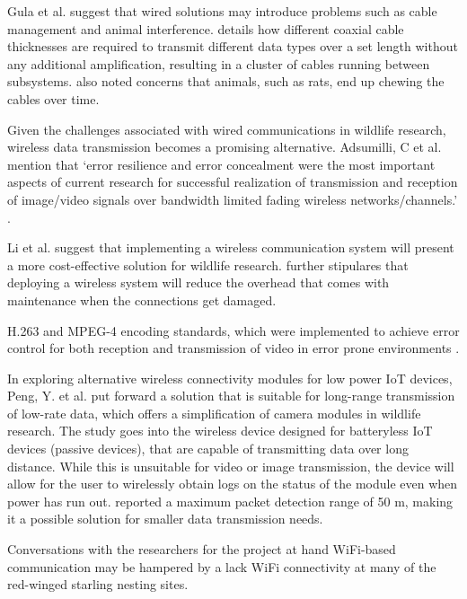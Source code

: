 \documentclass[class=report,11pt,crop=false]{standalone}
\begin{document}
Gula et al. suggest that wired solutions may introduce problems such as cable management and animal interference. \cite{gula2010audio} details how different coaxial cable thicknesses are required to transmit different data types over a set length without any additional amplification, resulting in a cluster of cables running between subsystems. \cite{gula2010audio} also noted concerns that animals, such as rats, end up chewing the cables over time. 

Given the challenges associated with wired communications in wildlife research, wireless data transmission becomes a promising alternative. Adsumilli, C et al.  mention that ‘error resilience and error concealment were the most important aspects of current research for successful realization of transmission and reception of image/video signals over bandwidth limited fading wireless networks/channels.’ \cite{adsumilli2002adaptive}. %

Li et al. \cite{li2010design} suggest that implementing a wireless communication system will present a more cost-effective solution for wildlife research.  \cite{li2010design} further stipulares that deploying a wireless system will reduce the overhead that comes with maintenance when the connections get damaged.

\cite{adsumilli2002adaptive} H.263 and MPEG-4 encoding standards, which were implemented to achieve error control for both reception and transmission of video in error prone environments \cite{adsumilli2002adaptive}.

In exploring alternative wireless connectivity modules for low power IoT devices, Peng, Y. et al. \cite{peng2018plora} put forward a solution that is suitable for long-range transmission of low-rate data, which offers a simplification of camera modules in wildlife research. The study goes into the wireless device designed for batteryless IoT devices (passive devices), that are capable of transmitting data over long distance. While this is unsuitable for video or image transmission, the device will allow for the user to wirelessly obtain logs on the status of the module even when power has run out. \cite{peng2018plora} reported a maximum packet detection range of 50 m, making it a possible solution for smaller data transmission needs. %

Conversations with the researchers for the project at hand \cite{hofmeyer2024private} WiFi-based communication may be hampered by a lack WiFi connectivity at many of the red-winged starling nesting sites.
\end{document}
